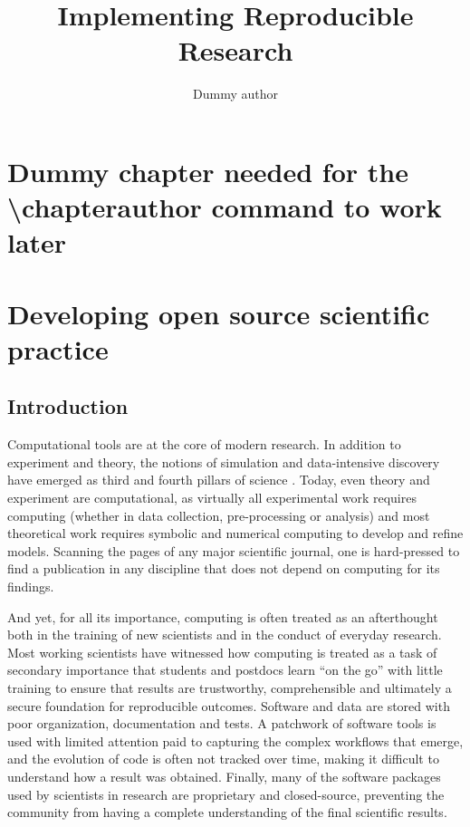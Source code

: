 \documentclass[ChapterTOCs,krantz2]{krantz} %
\theoremstyle{definition}
\begin{document}
\title{Implementing Reproducible Research}
\author{Dummy author}
\chapter*{Dummy chapter needed for the \textbackslash chapterauthor command to work later}

\mainmatter


\chapter{Developing open source scientific practice}

\section{Introduction}\label{intro}

Computational tools are at the core of modern research. In addition
to experiment and theory, the notions of simulation and data-intensive
discovery have emerged as third and fourth pillars of science \cite{4th-paradigm}.
Today, even theory and experiment are computational, as virtually
all experimental work requires computing (whether in data collection,
pre-processing or analysis) and most theoretical work requires symbolic
and numerical computing to develop and refine models. Scanning the pages
of any major scientific journal, one is hard-pressed to find a publication
in any discipline that does not depend on computing for its findings.

And yet, for all its importance, computing is often treated as an
afterthought both in the training of new scientists and in the conduct of
everyday research. Most working scientists have witnessed how computing is
treated as a task of secondary importance that students and postdocs learn
``on the go'' with little training to ensure that results are trustworthy,
comprehensible and ultimately a secure foundation for reproducible outcomes.
Software and data are stored with poor organization, documentation and tests.
A patchwork of software tools is used with limited attention paid to
capturing the complex workflows that emerge, and the evolution of code is
often not tracked over time, making it difficult to understand how a result
was obtained. Finally, many of the software packages used by scientists in
research are proprietary and closed-source, preventing the community from
having a complete understanding of the final scientific results.
\end{document}
